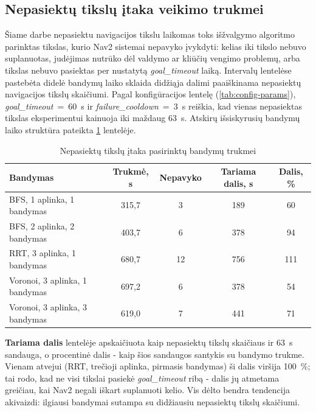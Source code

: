 \documentclass[]{VUMIFTemplateClass}
\begin{document}
\subsection{Nepasiektų tikslų įtaka veikimo trukmei}

Šiame darbe nepasiektu navigacijos tikslu laikomas toks išžvalgymo algoritmo parinktas tikslas, kurio Nav2 sistemai nepavyko įvykdyti: kelias iki tikslo nebuvo
suplanuotas, judėjimas nutrūko dėl valdymo ar kliūčių vengimo problemų, arba tikslas nebuvo pasiektas per nustatytą \textit{goal\_timeout} laiką. Intervalų
lentelėse pastebėta didelė bandymų laiko sklaida didžiąja dalimi paaiškinama nepasiektų navigacijos tikslų skaičiumi. Pagal konfigūracijos
lentelę (\ref{tab:config-params}), \textit{goal\_timeout}~=~60~s ir \textit{failure\_cooldown}~=~3~s reiškia, kad vienas nepasiektas tikslas eksperimentui
kainuoja iki maždaug 63~s. Atskirų išsiskyrusių bandymų laiko struktūra pateikta \ref{tab:failures-impact} lentelėje.

\begin{table}[H]
\centering
\caption{Nepasiektų tikslų įtaka pasirinktų bandymų trukmei}
\label{tab:failures-impact}
\small
\setlength{\tabcolsep}{4pt}
\begin{tabular}{|l|c|c|c|c|}
\hline
\textbf{Bandymas} & \textbf{Trukmė, s} & \textbf{Nepavyko} & \textbf{Tariama dalis, s} & \textbf{Dalis, \%} \\
\hline
BFS, 1 aplinka, 1 bandymas & 315,7 & 3 & 189 & 60 \\
\hline
BFS, 2 aplinka, 2 bandymas & 403,7 & 6 & 378 & 94 \\
\hline
RRT, 3 aplinka, 1 bandymas & 680,7 & 12 & 756 & 111 \\
\hline
Voronoi, 3 aplinka, 1 bandymas & 697,2 & 6 & 378 & 54 \\
\hline
Voronoi, 3 aplinka, 3 bandymas & 619,0 & 7 & 441 & 71 \\
\hline
\end{tabular}
\end{table}

\textbf{Tariama dalis} lentelėje apskaičiuota kaip nepasiektų tikslų skaičiaus ir 63~s sandauga, o procentinė dalis - kaip šios sandaugos santykis su bandymo trukme.
Vienam atvejui (RRT, trečioji aplinka, pirmasis bandymas) ši dalis viršija 100~\%; tai rodo, kad ne visi tikslai pasiekė \textit{goal\_timeout} ribą - dalis
jų atmetama greičiau, kai Nav2 negali iškart suplanuoti kelio. Vis dėlto bendra tendencija akivaizdi: ilgiausi bandymai sutampa su didžiausiu nepasiektų
tikslų skaičiumi.
\end{document}

